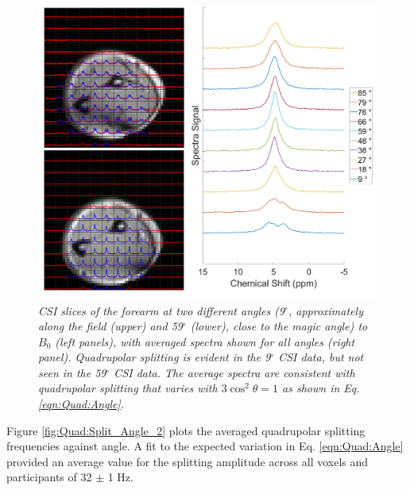 \begin{figure}
    \centering
    \includegraphics[width=1\textwidth]{Figures/Quad/Arm_CSI_Angle.png}
    \caption{\textit{\ac{CSI} slices of the forearm at two different angles (9$^\circ$, approximately along the field (upper) and 59$^\circ$ (lower), close to the magic angle) to $B_0$ (left panels), with averaged spectra shown for all angles (right panel). Quadrupolar splitting is evident in the 9$^\circ$ \ac{CSI} data, but not seen in the 59$^\circ$ \ac{CSI} data. The average spectra are consistent with quadrupolar splitting that varies with $3\cos^2\theta = 1$ as shown in Eq. \ref{eqn:Quad:Angle}.}}
    \label{fig:Quad:Arm_CSI}
\end{figure}

 Figure \ref{fig:Quad:Split_Angle_2} plots the averaged quadrupolar splitting frequencies against angle. A fit to the expected variation in Eq. \ref{eqn:Quad:Angle} provided an average value for the splitting amplitude across all voxels and participants of 32 $\pm$ 1 Hz. 

